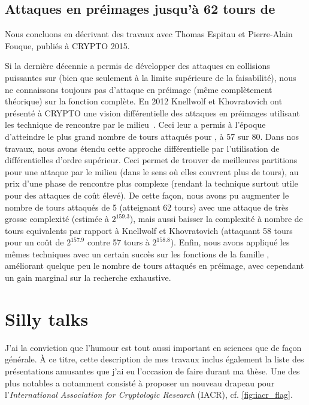 \subsection{Attaques en préimages jusqu'à 62 tours de \shaone \cite{DBLP:conf/crypto/EspitauFK15}}

Nous concluons en décrivant des travaux avec Thomas Espitau et Pierre-Alain Fouque, publiés à CRYPTO 2015.

\medskip

Si la dernière décennie a permis de développer des attaques en collisions puissantes sur \shaone (bien que seulement à la limite supérieure de la faisabilité), nous ne connaissons toujours
pas d'attaque en préimage (même complètement théorique) sur la fonction complète.
En 2012 Knellwolf et Khovratovich ont présenté à CRYPTO une vision différentielle des attaques en préimages utilisant les technique de rencontre par le milieu~\cite{DBLP:conf/crypto/KnellwolfK12}.
Ceci leur a permis à l'époque d'atteindre le plus grand nombre de tours attaqués pour \shaone, à 57 sur 80.
Dans nos travaux, nous avons étendu cette approche différentielle par l'utilisation de différentielles d'ordre supérieur. Ceci permet de trouver de meilleures partitions pour une attaque par
le milieu (dans le sens où elles couvrent plus de tours), au prix d'une phase de rencontre plus complexe (rendant la technique surtout utile pour des attaques de coût élevé). De cette façon,
nous avons pu augmenter le nombre de tours attaqués de 5 (atteignant 62 tours) avec une attaque de très grosse complexité (estimée à $2^{159.3}$), mais aussi baisser la complexité à nombre
de tours equivalents par rapport à Knellwolf et Khovratovich (attaquant 58 tours pour un coût de $2^{157.9}$ contre 57 tours à $2^{158.8}$). Enfin, nous avons appliqué les mêmes
techniques avec un certain succès sur les fonctions de la famille \blake, améliorant quelque peu le nombre de tours attaqués en préimage, avec cependant un gain marginal sur la
recherche exhaustive. 


\section[Divertissements]{Silly talks}

J'ai la conviction que l'humour est tout aussi important en sciences que de façon générale. À ce titre, cette description de mes travaux inclus également la liste des présentations amusantes
que j'ai eu l'occasion de faire durant ma thèse. Une des plus notables a notamment consisté à proposer un nouveau drapeau pour l'\emph{International Association for Cryptologic
Research} (IACR), cf. \autoref{fig:iacr_flag}. 

